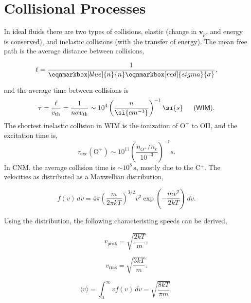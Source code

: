 \section*{Collisional Processes}
In ideal fluids there are two types of collisions, \textsf{elastic} (change in $\mathbf{v}_p$, and energy is conserved), and \textsf{inelastic collisions} (with the transfer of energy). The mean free path is the average distance between collisions, 
\begin{Note}
\begin{equation}
  \ell = \frac{1}{\eqnmarkbox[blue]{n}{n} \eqnmarkbox[red]{sigma}{\sigma}},
\end{equation}
\vspace{5mm}
\end{Note}
and the \textsf{average time between collisions} is 
\begin{equation}
  \tau = \frac{\ell}{v_{\text{th}}} = \frac{1}{n\sigma v_{\text{th}}} \sim 10^4 \left(\frac{n}{\si{cm^{-3}}}\right)^{-1}\si{s} \text{ \hspace{0.3cm}  (\textsf{WIM})}. 
\end{equation} 
The shortest inelastic collision in WIM is the ionization of $\text{O}^+$ to OII, and the excitation time is, 
\begin{equation}
  \tau_{\text{exc}}(\text{O}^+) \sim 10^{11} \left(\frac{n_{\text{O}^+}/ n_e}{10^{-3}}\right)^{-1}\si{s}.
\end{equation}
\newpage
In CNM, the average collision time is $\sim 10^8\, \text{s}$, mostly due to the C$^+$. The velocities as distributed as a \textsf{Maxwellian distribution},
\begin{definition}
\begin{equation}
  f(v)\,dv = 4\pi \left(\frac{m}{2\pi kT}\right)^{3/2} v^2 \exp\left(-\frac{mv^2}{2kT}\right)\,dv. 
\end{equation}
\vspace{-0.5cm}
\end{definition}
Using the distribution, the following characteristing speeds can be derived,
\begin{Note}
\begin{equation}
  v_{\text{peak}} = \sqrt{\frac{2kT}{m}},
\end{equation}
\end{Note}
\begin{Note}
\begin{equation}
  v_{\text{rms}} = \sqrt{\frac{3kT}{m}}. 
\end{equation}
\end{Note}
\begin{Note}
\begin{equation}
  \langle v \rangle = \int_0^\infty v f(v)\,dv =  \sqrt{\frac{8kT}{\pi m}},
\end{equation}
\end{Note}


